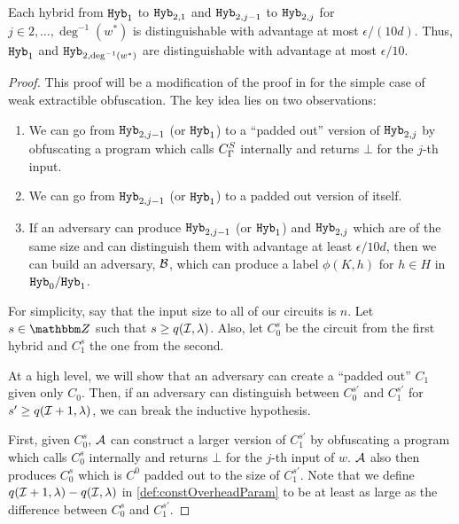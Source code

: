 \begin{lemma}
	\label{lemma:hybB}
	Each hybrid from $\texttt{Hyb}_1$ to $\texttt{Hyb}_{2, 1}$ and $\texttt{Hyb}_{2, j - 1}$ to $\texttt{Hyb}_{2, j}$ for $j \in 2, \dots, \deg^{-1}(w^*)$
	is distinguishable with advantage at most $\epsilon / (10d)$. Thus, $\texttt{Hyb}_1$ and $\texttt{Hyb}_{2, \deg^{-1}(w^*)}$ are distinguishable with advantage at most $\epsilon / 10$.
	\begin{proof}
		This proof will be a modification of the proof in \cite{ishai2015public} for the simple case of weak extractible obfuscation.
		The key idea lies on two observations:
		\begin{enumerate}[labelsep=0.1em]
			\item We can go from $\texttt{Hyb}_{2, j - 1}$ (or $\texttt{Hyb}_1$) to a ``padded out'' version of $\texttt{Hyb}_{2, j}$ by obfuscating a program which calls ${C_\Gamma^S}$ internally and returns $\bot$ for the $j$-th input.
			\item We can go from $\texttt{Hyb}_{2, j - 1}$ (or $\texttt{Hyb}_1$) to a padded out version of itself.
			\item If an adversary can produce $\texttt{Hyb}_{2, j - 1}$ (or $\texttt{Hyb}_1$) and $\texttt{Hyb}_{2, j}$ which are of the same size and can distinguish them with advantage at least $\epsilon / 10d$,
			then we can build an adversary, $\mathcal{B}$, which can produce a label $\phi(K, h)$ for $h \in H$ in $\texttt{Hyb}_0/ \texttt{Hyb}_1$.
		\end{enumerate}

		For simplicity, say that the input size to all of our circuits is $n$. Let $s \in \Z$ such that $s \geq q(\mathcal{I}, \lambda)$.
		Also, let $C_0^s$ be the circuit from the first hybrid and $C_1^s$ the one from the second.

		At a high level, we will show that an adversary can create a ``padded out'' $C_1$ given only $C_0$. Then, 
		if an adversary can distinguish between $C_0^{s'}$ and $C_1^{s'}$ for $s' \geq q(\mathcal{I} + 1, \lambda)$, we can break the inductive hypothesis.

		First, given $C_0^s$, $\mathcal{A}$ can construct a larger version of $C_1^{s'}$ by obfuscating a program which calls $C_0^s$ internally and returns $\bot$ for the $j$-th input of $w$.
		$\mathcal{A}$ also then produces $C_0^s$ which is $C^0$ padded out to the size of $C_1^{s'}$.
		Note that we define $q(\mathcal{I} + 1, \lambda) - q(\mathcal{I}, \lambda)$ in \cref{def:constOverheadParam} to be
		at least as large as the difference between $C_0^s$ and $C_1^{s'}$.


\end{proof}
\end{lemma}
